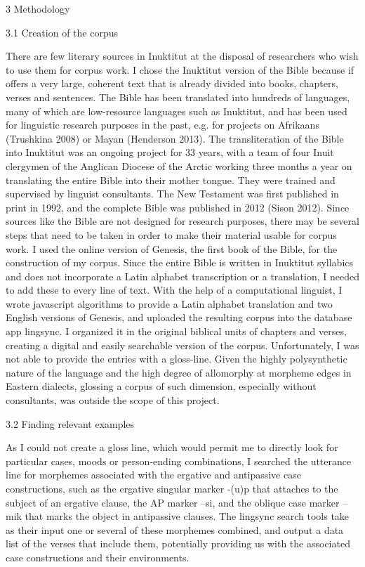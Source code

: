 \documentclass[12pt]{article}
\begin{document}
3 Methodology

3.1 Creation of the corpus

There are few literary sources in Inuktitut at the disposal of researchers who wish to use them for corpus work. I chose the Inuktitut version of the Bible because if offers a very large, coherent text that is already divided into books, chapters, verses and sentences. The Bible has been translated into hundreds of languages, many of which are low-resource languages such as Inuktitut, and has been used for linguistic research purposes in the past, e.g. for projects on Afrikaans (Trushkina 2008) or Mayan (Henderson 2013). 
The transliteration of the Bible into Inuktitut was an ongoing project for 33 years, with a team of four Inuit clergymen of the Anglican Diocese of the Arctic working three months a year on translating the entire Bible into their mother tongue. They were trained and supervised by linguist consultants. The New Testament was first published in print in 1992, and the complete Bible was published in 2012 (Sison 2012).
Since sources like the Bible are not designed for research purposes, there may be several steps that need to be taken in order to make their material usable for corpus work. I used the online version of Genesis, the first book of the Bible, for the construction of my corpus. Since the entire Bible is written in Inuktitut syllabics and does not incorporate a Latin alphabet transcription or a translation, I needed to add these to every line of text. With the help of a computational linguist, I wrote javascript algorithms to provide a Latin alphabet translation and two English versions of Genesis, and uploaded the resulting corpus into the database app lingsync. I organized it in the original biblical units of chapters and verses, creating a digital and easily searchable version of the corpus. Unfortunately, I was not able to provide the entries with a gloss-line. Given the highly polysynthetic nature of the language and the high degree of allomorphy at morpheme edges in Eastern dialects, glossing a corpus of such dimension, especially without consultants, was outside the scope of this project.


3.2 Finding relevant examples

As I could not create a gloss line, which would permit me to directly look for particular cases, moods or person-ending combinations, I searched the utterance line for morphemes associated with the ergative and antipassive case constructions, such as the ergative singular marker -(u)p that attaches to the subject of an ergative clause, the AP marker –si, and the oblique case marker –mik that marks the object in antipassive clauses. The lingsync search tools take as their input one or several of these morphemes combined, and output a data list of the verses that include them, potentially providing us with the associated case constructions and their environments.
\end{document}
